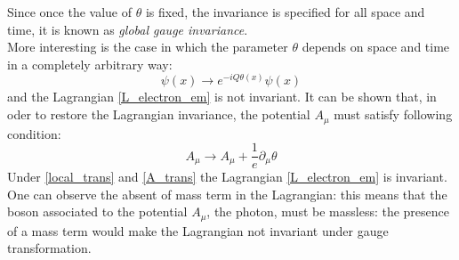 Since once the value of $\theta$ is fixed, the invariance is specified for all space and time, it is known as \textit{global gauge invariance}. \\
More interesting is the case in which the parameter $\theta$ depends on space and time in a completely arbitrary way:
\begin{equation}
\psi(x)\to e^{-iQ\theta(x)} \psi(x)
\label{local_trans}
\end{equation}
and the Lagrangian \ref{L_electron_em} is not invariant.
It can be shown that, in oder to restore the Lagrangian invariance, the potential $A_{\mu}$ must satisfy following condition:
\begin{equation}
A_{\mu} \to A_{\mu} + \frac{1}{e}\partial_{\mu}\theta
\label{A_trans}
\end{equation}
Under \ref{local_trans} and \ref{A_trans} the Lagrangian \ref{L_electron_em} is invariant.\\ 
One can observe the absent of mass term in the Lagrangian: this means that the boson associated to the potential $A_{\mu}$, the photon, must be massless: the presence of a mass term would make the Lagrangian not invariant under gauge transformation. \\

